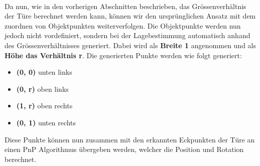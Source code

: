 \paragraph{}
Da nun, wie in den vorherigen Abschnitten beschrieben, das Grössenverhältnis der Türe berechnet werden kann, können wir den ursprünglichen Ansatz mit dem zuordnen von Objektpunkten weiterverfolgen. Die Objektpunkte werden nun jedoch nicht vordefiniert, sondern bei der Lagebestimmung automatisch anhand des Grössenverhältnisses generiert. Dabei wird als \textbf{Breite 1} angenommen und als \textbf{Höhe das Verhältnis r}. Die generierten Punkte werden wie folgt generiert:

\begin{itemize}
\item \textbf{(0, 0)} unten links
\item \textbf{(0, r)} oben links
\item \textbf{(1, r)} oben rechts
\item \textbf{(0, 1)} unten rechts
\end{itemize}

Diese Punkte können nun zusammen mit den erkannten Eckpunkten der Türe an einen PnP Algorithmus übergeben werden, welcher die Position und Rotation berechnet.

